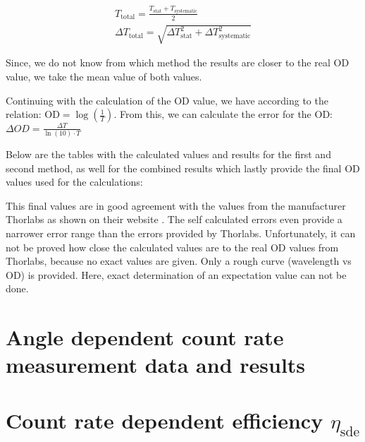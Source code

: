 \begin{align}
    T_{\text{total}} = \frac{T_{\text{stat}} + T_{\text{systematic}}}{2}\\
    \Delta T_{\text{total}} = \sqrt{\Delta T_{\text{stat}}^2 + \Delta T_{\text{systematic}}^2}
\end{align}

Since, we do not know from which method the results are closer to the real OD value, we take the mean value of both values.

Continuing with the calculation of the OD value, we have according to \cite{Thorlabs-OD} the relation:
 $\text{OD}= \log(\frac{1}{T})$.
From this, we can calculate the error for the OD: $\Delta OD = \frac{\Delta T}{\ln(10) \cdot T}$



Below are the tables with the calculated values and results for the first and second method, as well for the combined results
which lastly provide the final OD values used for the calculations:

%



\FloatBarrier
%
This final values are in good agreement with the values from the manufacturer Thorlabs as shown on their website \cite{Thorlabs-OD}.
The self calculated errors even provide a narrower error range than the errors provided by Thorlabs.
Unfortunately, it can not be proved how close the calculated values are to the real OD values from Thorlabs, because no
exact values are given.
Only a rough curve (wavelength vs OD) is provided.
Here, exact determination of an expectation value can not be done.

\newpage
\section{Angle dependent count rate measurement data and results}\label{sec:angle_dependent_countrate_results_appendix}



\FloatBarrier

\section{Count rate dependent efficiency $\eta_{\text{sde}}$}\label{sec:countrate_sde_results_appendix}

